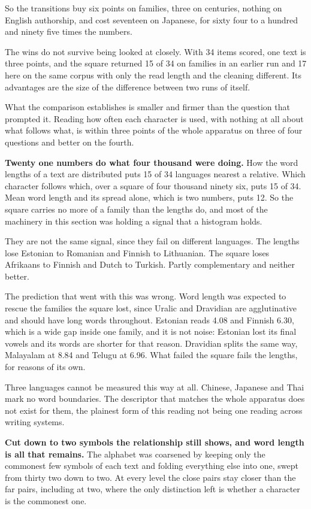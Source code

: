 So the transitions buy six points on families, three on centuries, nothing on English authorship, and cost seventeen on Japanese, for sixty four to a hundred and ninety five times the numbers.

The wins do not survive being looked at closely. With 34 items scored, one text is three points, and the square returned 15 of 34 on families in an earlier run and 17 here on the same corpus with only the read length and the cleaning different. Its advantages are the size of the difference between two runs of itself.

What the comparison establishes is smaller and firmer than the question that prompted it. Reading how often each character is used, with nothing at all about what follows what, is within three points of the whole apparatus on three of four questions and better on the fourth.

\textbf{Twenty one numbers do what four thousand were doing.} How the word lengths of a text are distributed puts 15 of 34 languages nearest a relative. Which character follows which, over a square of four thousand ninety six, puts 15 of 34. Mean word length and its spread alone, which is two numbers, puts 12. So the square carries no more of a family than the lengths do, and most of the machinery in this section was holding a signal that a histogram holds.

They are not the same signal, since they fail on different languages. The lengths lose Estonian to Romanian and Finnish to Lithuanian. The square loses Afrikaans to Finnish and Dutch to Turkish. Partly complementary and neither better.

The prediction that went with this was wrong. Word length was expected to rescue the families the square lost, since Uralic and Dravidian are agglutinative and should have long words throughout. Estonian reads 4.08 and Finnish 6.30, which is a wide gap inside one family, and it is not noise: Estonian lost its final vowels and its words are shorter for that reason. Dravidian splits the same way, Malayalam at 8.84 and Telugu at 6.96. What failed the square fails the lengths, for reasons of its own.

Three languages cannot be measured this way at all. Chinese, Japanese and Thai mark no word boundaries. The descriptor that matches the whole apparatus does not exist for them, the plainest form of this reading not being one reading across writing systems.

\textbf{Cut down to two symbols the relationship still shows, and word length is all that remains.} The alphabet was coarsened by keeping only the commonest few symbols of each text and folding everything else into one, swept from thirty two down to two. At every level the close pairs stay closer than the far pairs, including at two, where the only distinction left is whether a character is the commonest one.

